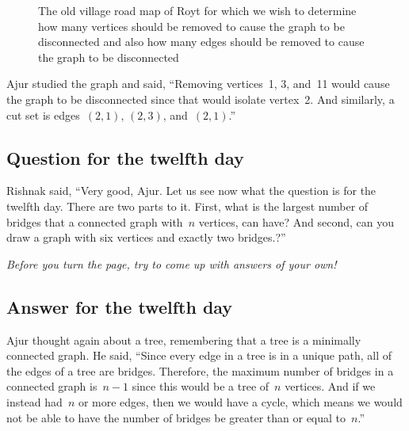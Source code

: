 \begin{figure}
\begin{center}

\caption{The old village road map of Royt for which we wish to determine how many vertices should be removed to cause the graph to be disconnected and also how many edges should be removed to cause the graph to be disconnected}\label{14g3}
\end{center}
\end{figure}

Ajur studied the graph and said, ``Removing vertices~1, 3, and~11 would cause the graph to be disconnected since that would isolate vertex~2. And similarly, a cut set is edges~$(2,1)$, $(2,3)$, and~$(2,1)$.''

\subsection*{Question for the twelfth day}
Rishnak said, ``Very good, Ajur.  Let us see now what the question is for the twelfth day. There are two parts to it. First, what is the largest number of bridges that a connected graph with~$n$ vertices, can have? And second, can you draw a graph with six vertices and exactly two bridges.?''

\textit{Before you turn the page, try to come up with answers of your own!}

\newpage
\subsection*{Answer for the twelfth day}
Ajur thought again about a tree, remembering that a tree is a minimally connected graph. He said, ``Since every edge in a tree is in a unique path, all of the edges of a tree are bridges. Therefore, the maximum number of bridges in a connected graph is~$n-1$ since this would be a tree of~$n$ vertices. And if we instead had~$n$ or more edges, then we would have a cycle, which means we would not be able to have the number of bridges be greater than or equal to~$n$.''

